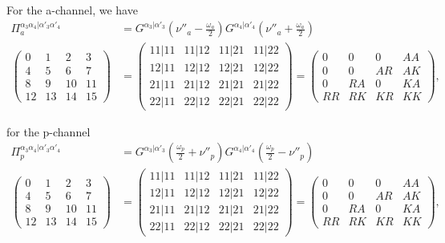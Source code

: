 \documentclass[12pt,a4paper,roman]{article}
\begin{document}
For the a-channel, we have
\begin{align}
\Pi_a^{\alpha_3\alpha_4|\alpha'_3\alpha'_4} &= G^{\alpha_3|\alpha'_3}\left(\nu''_a-\frac{\omega_a}{2}\right)G^{\alpha_4|\alpha'_4}\left(\nu''_a+\frac{\omega_a}{2}\right)\\
\begin{pmatrix}
0  & 1  & 2   & 3\\
4  & 5  & 6   & 7\\
8  & 9  & 10 & 11\\
12& 13&14 & 15
\end{pmatrix} &=
\begin{pmatrix}
11|11 & 11|12 & 11|21 & 11|22 \\
12|11 & 12|12 & 12|21 & 12|22\\
21|11 & 21|12 & 21|21 & 21|22\\
22|11 & 22|12 & 22|21 & 22|22
\end{pmatrix} = \begin{pmatrix}
0    & 0    & 0    & AA \\
0    & 0    & AR & AK\\
0    & RA & 0    & KA\\
RR & RK & KR & KK
\end{pmatrix},
\label{eq:Pia}
\end{align}

for the p-channel
\begin{align}
\Pi_p^{\alpha_3\alpha_4|\alpha'_3\alpha'_4} &= G^{\alpha_3|\alpha'_3}\left(\frac{\omega_p}{2}+\nu''_p\right)G^{\alpha_4|\alpha'_4}\left(\frac{\omega_p}{2}-\nu''_p\right)\\
\begin{pmatrix}
0  & 1  & 2   & 3\\
4  & 5  & 6   & 7\\
8  & 9  & 10 & 11\\
12& 13&14 & 15
\end{pmatrix} &=
\begin{pmatrix}
11|11 & 11|12 & 11|21 & 11|22 \\
12|11 & 12|12 & 12|21 & 12|22\\
21|11 & 21|12 & 21|21 & 21|22\\
22|11 & 22|12 & 22|21 & 22|22
\end{pmatrix} = \begin{pmatrix}
0    & 0    & 0    & AA \\
0    & 0    & AR & AK\\
0    & RA & 0    & KA\\
RR & RK & KR & KK
\end{pmatrix},
\label{eq:Pip}
\end{align}
\end{document}
